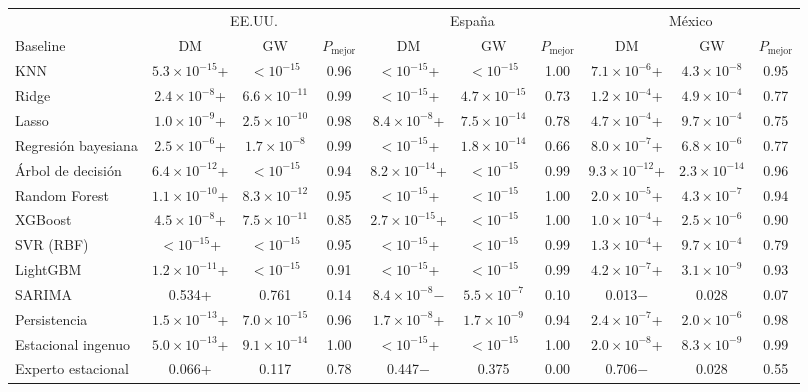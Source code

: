 \begin{tabular}{lccccccccc}
\toprule
 & \multicolumn{3}{c}{EE.UU.} & \multicolumn{3}{c}{España} & \multicolumn{3}{c}{México} \\
\cmidrule(lr){2-4}\cmidrule(lr){5-7}\cmidrule(lr){8-10}
Baseline & DM & GW & $P_{\mathrm{mejor}}$ & DM & GW & $P_{\mathrm{mejor}}$ & DM & GW & $P_{\mathrm{mejor}}$ \\
\midrule
KNN & $5.3\times10^{-15}$+ & $<10^{-15}$ & 0.96 & $<10^{-15}$+ & $<10^{-15}$ & 1.00 & $7.1\times10^{-6}$+ & $4.3\times10^{-8}$ & 0.95 \\
Ridge & $2.4\times10^{-8}$+ & $6.6\times10^{-11}$ & 0.99 & $<10^{-15}$+ & $4.7\times10^{-15}$ & 0.73 & $1.2\times10^{-4}$+ & $4.9\times10^{-4}$ & 0.77 \\
Lasso & $1.0\times10^{-9}$+ & $2.5\times10^{-10}$ & 0.98 & $8.4\times10^{-8}$+ & $7.5\times10^{-14}$ & 0.78 & $4.7\times10^{-4}$+ & $9.7\times10^{-4}$ & 0.75 \\
Regresión bayesiana & $2.5\times10^{-6}$+ & $1.7\times10^{-8}$ & 0.99 & $<10^{-15}$+ & $1.8\times10^{-14}$ & 0.66 & $8.0\times10^{-7}$+ & $6.8\times10^{-6}$ & 0.77 \\
Árbol de decisión & $6.4\times10^{-12}$+ & $<10^{-15}$ & 0.94 & $8.2\times10^{-14}$+ & $<10^{-15}$ & 0.99 & $9.3\times10^{-12}$+ & $2.3\times10^{-14}$ & 0.96 \\
Random Forest & $1.1\times10^{-10}$+ & $8.3\times10^{-12}$ & 0.95 & $<10^{-15}$+ & $<10^{-15}$ & 1.00 & $2.0\times10^{-5}$+ & $4.3\times10^{-7}$ & 0.94 \\
XGBoost & $4.5\times10^{-8}$+ & $7.5\times10^{-11}$ & 0.85 & $2.7\times10^{-15}$+ & $<10^{-15}$ & 1.00 & $1.0\times10^{-4}$+ & $2.5\times10^{-6}$ & 0.90 \\
SVR (RBF) & $<10^{-15}$+ & $<10^{-15}$ & 0.95 & $<10^{-15}$+ & $<10^{-15}$ & 0.99 & $1.3\times10^{-4}$+ & $9.7\times10^{-4}$ & 0.79 \\
LightGBM & $1.2\times10^{-11}$+ & $<10^{-15}$ & 0.91 & $<10^{-15}$+ & $<10^{-15}$ & 0.99 & $4.2\times10^{-7}$+ & $3.1\times10^{-9}$ & 0.93 \\
SARIMA & 0.534+ & 0.761 & 0.14 & $8.4\times10^{-8}$$-$ & $5.5\times10^{-7}$ & 0.10 & 0.013$-$ & 0.028 & 0.07 \\
Persistencia & $1.5\times10^{-13}$+ & $7.0\times10^{-15}$ & 0.96 & $1.7\times10^{-8}$+ & $1.7\times10^{-9}$ & 0.94 & $2.4\times10^{-7}$+ & $2.0\times10^{-6}$ & 0.98 \\
Estacional ingenuo & $5.0\times10^{-13}$+ & $9.1\times10^{-14}$ & 1.00 & $<10^{-15}$+ & $<10^{-15}$ & 1.00 & $2.0\times10^{-8}$+ & $8.3\times10^{-9}$ & 0.99 \\
Experto estacional & 0.066+ & 0.117 & 0.78 & 0.447$-$ & 0.375 & 0.00 & 0.706$-$ & 0.028 & 0.55 \\
\bottomrule
\end{tabular}